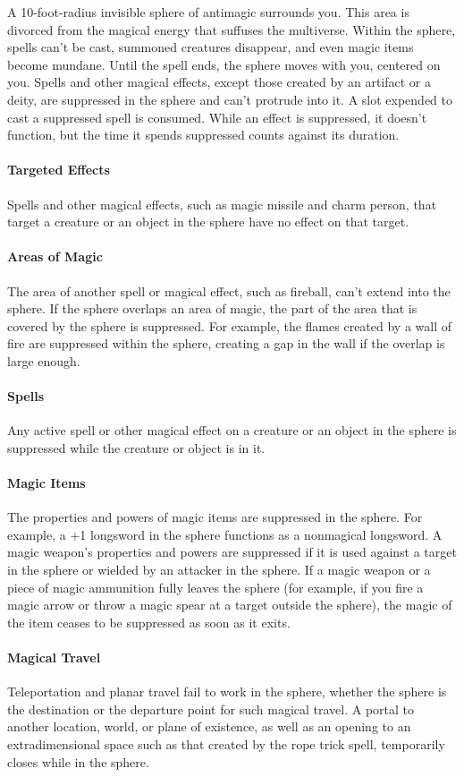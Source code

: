\documentclass[a5paper, 12pt]{memoir}
\begin{document}
\vspace{1\baselineskip}\noindent A 10-foot-radius invisible sphere of antimagic surrounds you. This area is divorced from the magical energy that suffuses the multiverse. Within the sphere, spells can't be cast, summoned creatures disappear, and even magic items become mundane. Until the spell ends, the sphere moves with you, centered on you. Spells and other magical effects, except those created by an artifact or a deity, are suppressed in the sphere and can't protrude into it. A slot expended to cast a suppressed spell is consumed. While an effect is suppressed, it doesn't function, but the time it spends suppressed counts against its duration. \paragraph{Targeted Effects} Spells and other magical effects, such as magic missile and charm person, that target a creature or an object in the sphere have no effect on that target. \paragraph{Areas of Magic} The area of another spell or magical effect, such as fireball, can't extend into the sphere. If the sphere overlaps an area of magic, the part of the area that is covered by the sphere is suppressed. For example, the flames created by a wall of fire are suppressed within the sphere, creating a gap in the wall if the overlap is large enough. \paragraph{Spells} Any active spell or other magical effect on a creature or an object in the sphere is suppressed while the creature or object is in it. \paragraph{Magic Items} The properties and powers of magic items are suppressed in the sphere. For example, a +1 longsword in the sphere functions as a nonmagical longsword. A magic weapon's properties and powers are suppressed if it is used against a target in the sphere or wielded by an attacker in the sphere. If a magic weapon or a piece of magic ammunition fully leaves the sphere (for example, if you fire a magic arrow or throw a magic spear at a target outside the sphere), the magic of the item ceases to be suppressed as soon as it exits. \paragraph{Magical Travel} Teleportation and planar travel fail to work in the sphere, whether the sphere is the destination or the departure point for such magical travel. A portal to another location, world, or plane of existence, as well as an opening to an extradimensional space such as that created by the rope trick spell, temporarily closes while in the sphere. 
\end{document}
